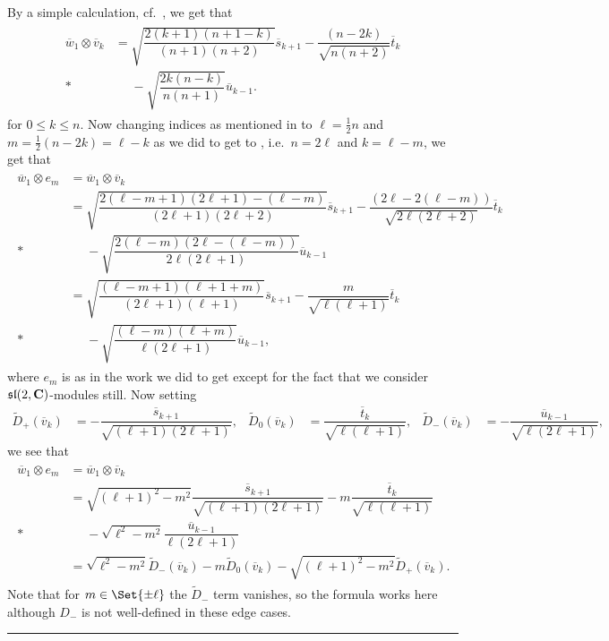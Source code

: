 By a simple calculation, cf.\ , we get that
\begin{align}\label{eq:barw_1tensorbarv_k}
  \begin{aligned}
    \overline w_1 \otimes \overline v_k &= \sqrt{\dfrac{2(k+1)(n+1-k)}{(n+1)(n+2)}}\overline s_{k+1} - \dfrac{(n-2k)}{\sqrt{n(n+2)}}\overline t_k \\*
    &\phantom{{}={}}{} - \sqrt{\dfrac{2k(n-k)}{n(n+1)}}\overline u_{k-1}.
  \end{aligned}
\end{align}
for $0\leq k\leq n$. Now changing indices as mentioned in  to $\ell = \tfrac{1}{2}n$ and $m=\tfrac{1}{2}(n-2k)=\ell-k$ as we did to get to , i.e.\ $n=2\ell$ and $k=\ell-m$, we get that
\begin{align*}
  \begin{aligned}
    \overline w_1\otimes e_m &= \overline w_1\otimes\overline v_k \\
    &= \sqrt{\dfrac{2(\ell-m+1)(2\ell+1)-(\ell-m)}{(2\ell+1)(2\ell+2)}}\overline s_{k+1} - \dfrac{(2\ell-2(\ell-m))}{\sqrt{2\ell(2\ell+2)}}\overline t_{k} \\*
    &\phantom{{}={}}{} - \sqrt{\dfrac{2(\ell-m)(2\ell-(\ell-m))}{2\ell(2\ell+1)}}\overline u_{k-1} \\
    &= \sqrt{\dfrac{(\ell-m+1)(\ell+1+m)}{(2\ell+1)(\ell+1)}}\overline s_{k+1} - \dfrac{m}{\sqrt{\ell(\ell+1)}}\overline t_{k} \\*
    &\phantom{{}={}}{} - \sqrt{\dfrac{(\ell-m)(\ell+m)}{\ell(2\ell+1)}}\overline u_{k-1},
  \end{aligned}
\end{align*}
where $e_m$ is as in the work we did to get  except for the fact that we consider $\mathfrak{sl}(2,\mathbf{C})$-modules still. Now setting
\begin{align*}
  \widetilde D_+(\overline v_k) &= -\dfrac{\overline s_{k+1}}{\sqrt{(\ell+1)(2\ell+1)}}, & \widetilde D_0(\overline v_k) &= \dfrac{\overline t_k}{\sqrt{\ell(\ell+1)}}, & \widetilde D_-(\overline v_k) &= -\dfrac{\overline u_{k-1}}{\sqrt{\ell(2\ell+1)}},
\end{align*}
we see that
\begin{align}\label{eq:Drelstilde}
  \begin{aligned}
    \overline w_1 \otimes e_m &= \overline w_1\otimes\overline v_k \\
    &=\sqrt{(\ell+1)^2-m^2}\dfrac{\overline s_{k+1}}{\sqrt{(\ell+1)(2\ell+1)}} - m\dfrac{\overline t_k}{\sqrt{\ell(\ell+1)}} \\*
    &\phantom{{}={}}{} - \sqrt{\ell^2-m^2}\dfrac{\overline u_{k-1}}{\ell(2\ell+1)} \\
    &= \sqrt{\ell^2-m^2}\widetilde D_-(\overline v_k) - m\widetilde D_0(\overline v_k) - \sqrt{(\ell+1)^2-m^2}\widetilde D_+(\overline v_k).
  \end{aligned}
\end{align}
Note that for $m\in\Set{\pm\ell}$ the $\widetilde D_-$ term vanishes, so the formula works here although $D_-$ is not well-defined in these edge cases.\fancybreak{* \quad * \quad * \quad * \quad *}

